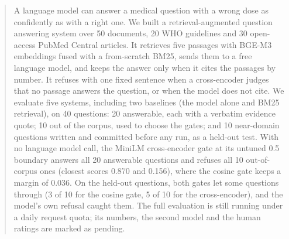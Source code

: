 \begin{abstract}
\noindent
A language model can answer a medical question with a wrong dose as confidently as with a right one. We built a retrieval-augmented question answering system over 50 documents, 20 WHO guidelines and 30 open-access PubMed Central articles. It retrieves five passages with BGE-M3 embeddings fused with a from-scratch BM25, sends them to a free language model, and keeps the answer only when it cites the passages by number. It refuses with one fixed sentence when a cross-encoder judges that no passage answers the question, or when the model does not cite. We evaluate five systems, including two baselines (the model alone and BM25 retrieval), on 40 questions: 20 answerable, each with a verbatim evidence quote; 10 out of the corpus, used to choose the gates; and 10 near-domain questions written and committed before any run, as a held-out test. With no language model call, the MiniLM cross-encoder gate at its untuned 0.5 boundary answers all 20 answerable questions and refuses all 10 out-of-corpus ones (closest scores 0.870 and 0.156), where the cosine gate keeps a margin of 0.036. On the held-out questions, both gates let some questions through (3 of 10 for the cosine gate, 5 of 10 for the cross-encoder), and the model's own refusal caught them. The full evaluation is still running under a daily request quota; its numbers, the second model and the human ratings are marked as pending.
\end{abstract}
